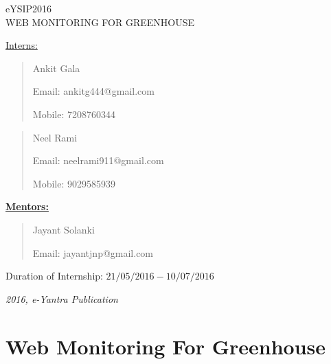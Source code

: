 \documentclass[a4paper,12pt,oneside]{book}
\begin{document}
\begin{titlepage}
\raggedright
{\Large eYSIP2016\\[1cm]}
{\Huge\scshape WEB MONITORING FOR GREENHOUSE \\[.1in]}

\vfill

        {\underline{\large{Interns:}}} \\
        \begin{quote}
        	\large{Ankit Gala}
        	
        	\large{Email: ankitg444@gmail.com}		
        	
        	\large{Mobile: 7208760344}
        \end{quote}
        
        
		
		\begin{quote}
			\large{Neel Rami}
        	
        	\large{Email: neelrami911@gmail.com}	
        	
        	\large{Mobile: 9029585939}
		\end{quote}
        
        
        \vspace{0.5cm}
        
          {\underline{\textbf{Mentors:}}} \\
          \begin{quote}
          \large{Jayant Solanki}
          
          \large{Email: jayantjnp@gmail.com}
          \end{quote}
          
          

\begin{flushright}
{\large Duration of Internship: $ 21/05/2016-10/07/2016 $ \\}

\end{flushright}
{\itshape 2016, e-Yantra Publication}



\end{titlepage}

\tableofcontents
\chapter[Web Monitoring For Greenhouse]{Web Monitoring For Greenhouse}
\end{document}
